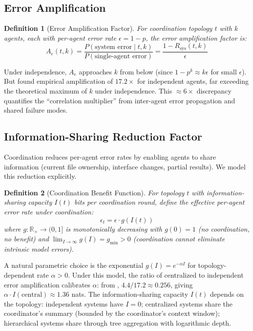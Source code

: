 \documentclass[11pt, a4paper]{googledeepmind}
\newtheorem{definition}{Definition}[section]
\begin{document}
\subsection{Error Amplification}

\begin{definition}[Error Amplification Factor]
\label{def:error-amp}
For coordination topology $t$ with $k$ agents, each with per-agent error rate $\epsilon = 1 - p$, the error amplification factor is:
\begin{equation}
    A_e(t, k) = \frac{P(\text{system error} \mid t, k)}{P(\text{single-agent error})} = \frac{1 - R_{\text{sys}}(t, k)}{\epsilon}
\end{equation}
\end{definition}

Under independence, $A_e$ approaches $k$ from below (since $1 - p^k \approx k\epsilon$ for small $\epsilon$). But \citet{kim2025scaling} found empirical amplification of $17.2\times$ for independent agents, far exceeding the theoretical maximum of $k$ under independence. This $\approx 6\times$ discrepancy quantifies the ``correlation multiplier'' from inter-agent error propagation and shared failure modes.

\subsection{Information-Sharing Reduction Factor}

Coordination reduces per-agent error rates by enabling agents to share information (current file ownership, interface changes, partial results). We model this reduction explicitly.

\begin{definition}[Coordination Benefit Function]
\label{def:coord-benefit}
For topology $t$ with information-sharing capacity $I(t)$ bits per coordination round, define the effective per-agent error rate under coordination:
\begin{equation}
    \epsilon_t = \epsilon \cdot g(I(t))
\end{equation}
where $g: \mathbb{R}_+ \to (0, 1]$ is monotonically decreasing with $g(0) = 1$ (no coordination, no benefit) and $\lim_{I \to \infty} g(I) = g_{\min} > 0$ (coordination cannot eliminate intrinsic model errors).
\end{definition}

A natural parametric choice is the exponential $g(I) = e^{-\alpha I}$ for topology-dependent rate $\alpha > 0$. Under this model, the ratio of centralized to independent error amplification calibrates $\alpha$: from \citet{kim2025scaling}, $4.4/17.2 \approx 0.256$, giving $\alpha \cdot I(\mathrm{central}) \approx 1.36$ nats. The information-sharing capacity $I(t)$ depends on the topology: independent systems have $I = 0$; centralized systems share the coordinator's summary (bounded by the coordinator's context window); hierarchical systems share through tree aggregation with logarithmic depth.
\end{document}
